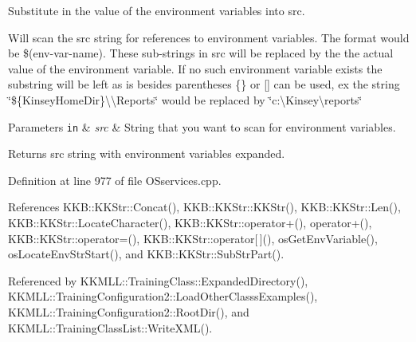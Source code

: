 Substitute in the value of the environment variables into \textquotesingle{}src\textquotesingle{}. 

Will scan the \textquotesingle{}src\textquotesingle{} string for references to environment variables. The format would be \$(env-\/var-\/name). These sub-\/strings in \textquotesingle{}src\textquotesingle{} will be replaced by the the actual value of the environment variable. If no such environment variable exists the substring will be left as is besides parentheses \textquotesingle{}\{\}\textquotesingle{} or \textquotesingle{}\mbox{[}\mbox{]}\textquotesingle{} can be used, ex the string \char`\"{}\$\{\+Kinsey\+Home\+Dir\}\textbackslash{}\textbackslash{}\+Reports\char`\"{} would be replaced by \char`\"{}c\+:\textbackslash{}\+Kinsey\textbackslash{}reports\char`\"{} 
\begin{DoxyParams}[1]{Parameters}
\mbox{\tt in}  & {\em src} & String that you want to scan for environment variables. \\
\hline
\end{DoxyParams}
\begin{DoxyReturn}{Returns}
\textquotesingle{}src\textquotesingle{} string with environment variables expanded. 
\end{DoxyReturn}


Definition at line 977 of file O\+Sservices.\+cpp.



References K\+K\+B\+::\+K\+K\+Str\+::\+Concat(), K\+K\+B\+::\+K\+K\+Str\+::\+K\+K\+Str(), K\+K\+B\+::\+K\+K\+Str\+::\+Len(), K\+K\+B\+::\+K\+K\+Str\+::\+Locate\+Character(), K\+K\+B\+::\+K\+K\+Str\+::operator+(), operator+(), K\+K\+B\+::\+K\+K\+Str\+::operator=(), K\+K\+B\+::\+K\+K\+Str\+::operator\mbox{[}$\,$\mbox{]}(), os\+Get\+Env\+Variable(), os\+Locate\+Env\+Str\+Start(), and K\+K\+B\+::\+K\+K\+Str\+::\+Sub\+Str\+Part().



Referenced by K\+K\+M\+L\+L\+::\+Training\+Class\+::\+Expanded\+Directory(), K\+K\+M\+L\+L\+::\+Training\+Configuration2\+::\+Load\+Other\+Classs\+Examples(), K\+K\+M\+L\+L\+::\+Training\+Configuration2\+::\+Root\+Dir(), and K\+K\+M\+L\+L\+::\+Training\+Class\+List\+::\+Write\+X\+M\+L().


